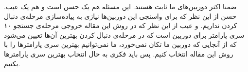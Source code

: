 \documentclass{report}
\renewcommand{\baselinestretch}{1.8}
\begin{document}
ضمنا اکثر دوربین‌های ما ثابت هستند. این مسئله هم یک حسن است و هم یک عیب. حسن از این نظر که برای واسنجی این دوربین‌ها نیازی به پیاده‌سازی مرحله‌ی دنبال کردن نداریم. و عیب از این نظر که در روش این مقاله خروجی مرحله‌ی جستجو ۱۰ سری پارامتر برای دوربین است که در مرحله‌ی دنبال کردن بهترین آن‌ها تعیین می‌شود که از آنجایی که دوربین ما تکان نمی‌خورد، ما نمی‌توانیم بهترین سری پارامترها را با روش این مقاله انتخاب کنیم. پس باید فکری به حال انتخاب بهترین سری پارامترها بکنیم.

\renewcommand{\baselinestretch}{1}
\renewcommand*{\refname}{\section{منابع}}

\begin{latin}
{}


\end{latin}
\end{document}
